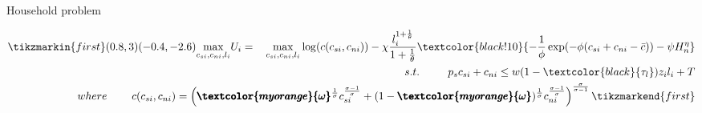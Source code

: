 \documentclass[11pt,aspectratio=169]{beamer}
\newcommand{\tr}[1]{\textcolor{blue}{#1}}
\begin{document}
		\addtocounter{framenumber}{-1}
	\begin{frame}{Household problem} %
		\hypertarget{backAtt}{}
		\vspace{2mm}
		\begin{minipage}[t!]{1\textwidth}
			\begin{align*}
			\tikzmarkin{first}(0.8,3)(-0.4,-2.6)
			\underset{c_{si},c_{ni}, l_i}{\max} U_i=\ \hspace{2mm} \underset{c_{si},c_{ni}, l_i}{\max} \log(c(c_{si},c_{ni}))-\chi\frac{l_i^{1+\frac{1}{\theta}}}{1+\frac{1}{\theta}}  \textcolor{black!10}{-\frac{1}{\phi}\exp(-\phi(c_{si}+c_{ni}-\bar{c})) -\psi H_n^\eta}\\
			s.t.\ \hspace{6mm}  \hspace{2mm }p_{s}c_{si}+c_{ni}\leq w(1-\textcolor{black}{\tau_l})z_il_i+T%
			\\
			where \hspace{8mm}c(c_{si},c_{ni}) =
			\left(\pmb{\textcolor{myorange}{\omega}}^{\frac{1}{\sigma}}c_{si}^{\frac{\sigma-1}{\sigma}}+(1-\pmb{\textcolor{myorange}{\omega}})^{\frac{1}{\sigma}}c_{ni}^{\frac{\sigma-1}{\sigma}}\right)^{\frac{\sigma}{\sigma-1}}%
			\tikzmarkend{first}
			\end{align*}
		\end{minipage}
		
		

\end{frame}
\end{document}
